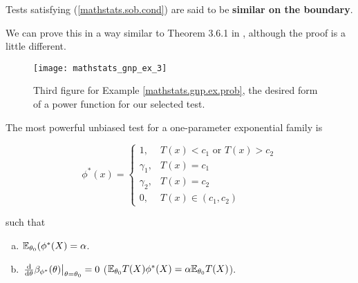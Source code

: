 \begin{solution}
\begin{remark}
  \end{remark}
 
 
 \begin{definition}\label{mathstats.def.sob}
 Tests satisfying (\ref{mathstats.sob.cond}) are said to be \textbf{similar on the boundary}. 

\end{definition}


We can prove this in a way similar to Theorem 3.6.1 in \citet{lehmann2005testing}, although the proof is a little different.

\begin{figure}[htbp]
\begin{center}
\texttt{[image: mathstats\_gnp\_ex\_3]}
\caption{Third figure for Example \ref{mathstats.gnp.ex.prob}, the desired form of a power function for our selected test.}
\label{mathstats_gnp_ex_fig_3}
\end{center}
\end{figure}

\end{solution}

\begin{theorem}

The most powerful unbiased test for a one-parameter exponential family is 

\[
\phi^*(x) = \begin{cases}
1, & T(x) < c_1 \text{ or } T(x) > c_2 \\
\gamma_1, & T(x) = c_1 \\
\gamma_2, & T(x) = c_2 \\
0, & T(x) \in (c_1, c_2)
\end{cases}
\]

such that 

\begin{enumerate}[(a)]

\item \(\E_{\theta_0}(\phi^*(X) = \alpha\).

\item \( \left. \deriv{}{\theta} \beta_{\phi^*}(\theta) \right|_{\theta = \theta_0} = 0\)  (\(\E_{\theta_0} T(X) \phi^*(X) = \alpha \E_{\theta_0} T(X)\)).

\end{enumerate}



\end{theorem}

